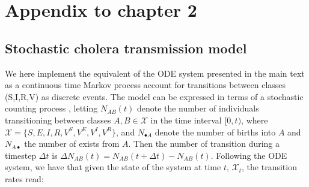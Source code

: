 \renewcommand{\thefigure}{\textsc{a}\arabic{figure}}
\renewcommand{\theequation}{\textsc{a}\arabic{equation}}
\renewcommand{\thetable}{\textsc{a}\arabic{table}}
\setcounter{figure}{0}
\setcounter{equation}{0}

\chapter{Appendix to chapter 2}
\section{Stochastic cholera transmission model}\label{sec:stoch}
We here implement the equivalent of the ODE system presented in the main text as a continuous time Markov process account for transitions between classes (S,I,R,V) as
discrete events. The model can be expressed in terms of a stochastic
counting process \cite{Breto2009}, letting \(N_{AB}(t)\) denote the number of individuals
transitioning between classes \(A,B\in \mathcal{X}\) in the time
interval \([0,t)\), where
\(\mathcal{X} = \{S, E, I, R, V^S, V^E, V^I, V^R\}\), and
\(N_{\bullet A}\) denote the number of births into \(A\) and
\(N_{A\bullet}\) the number of exists from \(A\). Then the number of transition during a timestep $\Delta t$ is
\(\Delta N_{AB}(t) = N_{AB}(t+\Delta t) - N_{AB}(t)\). Following the ODE
system, we have that given the state of the system at time \(t\),
\(\mathcal{X}_t\), the transition rates read:

